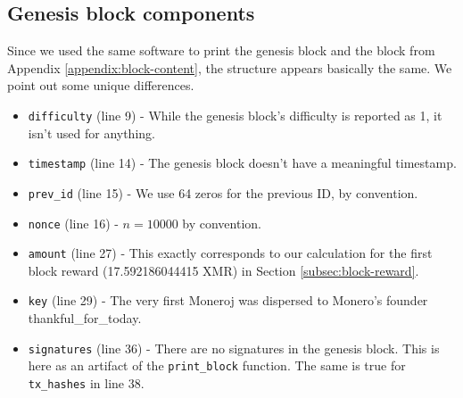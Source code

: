\begin{appendices}
\section*{Genesis block components}

Since we used the same software to print the genesis block and the block from Appendix \ref{appendix:block-content}, the structure appears basically the same. We point out some unique differences.

\begin{itemize}
	\item {\tt difficulty} (line 9) - While the genesis block's difficulty is reported as 1, it isn't used for anything.
	\item {\tt timestamp} (line 14) - The genesis block doesn't have a meaningful timestamp.
	\item {\tt prev\_id} (line 15) - We use 64 zeros for the previous ID, by convention.
	\item {\tt nonce} (line 16) - $n = 10000$ by convention.
	\item {\tt amount} (line 27) - This exactly corresponds to our calculation for the first block reward (17.592186044415 XMR) in Section \ref{subsec:block-reward}.
	\item {\tt key} (line 29) - The very first Moneroj was dispersed to Monero's founder thankful\_for\_today.
	\item {\tt signatures} (line 36) - There are no signatures in the genesis block. This is here as an artifact of the {\tt print\_block} function. The same is true for {\tt tx\_hashes} in line 38.
\end{itemize}


\end{appendices}